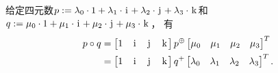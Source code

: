 \begin{theorem}
给定四元数\(
	p
	:=
	\lambda_0 \cdot 1
	+ \lambda_1 \cdot \kern1pt\mathrm{i}\kern1pt
	+ \lambda_2 \cdot \kern1pt\mathrm{j}\kern1pt
	+ \lambda_3 \cdot \kern1pt\mathrm{k}\kern1pt
\)和\(
	q
	:=
	\mu_0 \cdot 1
	+ \mu_1 \cdot \kern1pt\mathrm{i}\kern1pt
	+ \mu_2 \cdot \kern1pt\mathrm{j}\kern1pt
	+ \mu_3 \cdot \kern1pt\mathrm{k}\kern1pt
\)，
有\begin{align*}
	p \circ q
	&= \begin{bmatrix}
		1 & \kern1pt\mathrm{i}\kern1pt & \kern1pt\mathrm{j}\kern1pt & \kern1pt\mathrm{k}\kern1pt \\
	\end{bmatrix}
	p^\oplus
	\begin{bmatrix}
		\mu_0 & \mu_1 & \mu_2 & \mu_3 \\
	\end{bmatrix}^T \\
	&= \begin{bmatrix}
		1 & \kern1pt\mathrm{i}\kern1pt & \kern1pt\mathrm{j}\kern1pt & \kern1pt\mathrm{k}\kern1pt \\
	\end{bmatrix}
	q^+
	\begin{bmatrix}
		\lambda_0 & \lambda_1 & \lambda_2 & \lambda_3 \\
	\end{bmatrix}^T.
\end{align*}
\end{theorem}
